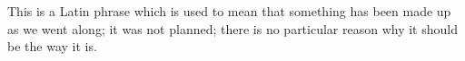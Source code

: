 This is a Latin phrase which is used to mean that something has been made
up as we went along; it was not planned; there is no particular reason why
it should be the way it is.